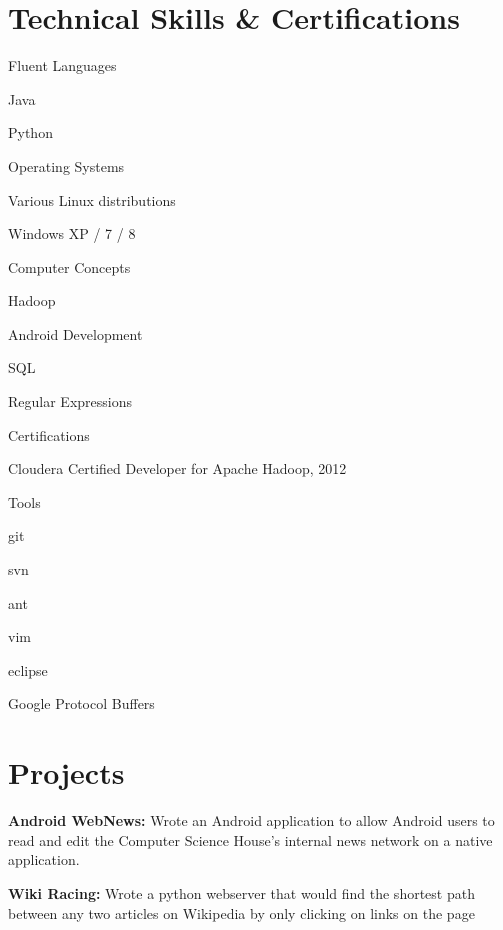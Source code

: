 \documentclass[a4paper,margin,line,11pt]{resume}
\begin{document}
\begin{resume}
\section{\mysidestyle Technical Skills \& Certifications}
	\begin{compactdesc}
		\item[Fluent Languages] \begin{inparaenum} { \small
			\item Java
			\item Python
		} \end{inparaenum}
		\item[Operating Systems] \begin{inparaenum} { \small
			\item Various Linux distributions
			\item Windows XP / 7 / 8
		} \end{inparaenum}
		\item[Computer Concepts] \begin{inparaenum} { \small
			\item Hadoop
			\item Android Development
			\item SQL
			\item Regular Expressions
		} \end{inparaenum}
		\item[Certifications] \begin{inparaenum} { \small
		    \item Cloudera Certified Developer for Apache Hadoop, 2012
		} \end{inparaenum}
        \item[Tools] \begin{inparaenum} { \small
            \item git
            \item svn
            \item ant
            \item vim
            \item eclipse
            \item Google Protocol Buffers
        } \end{inparaenum}
	\end{compactdesc}

\section{\mysidestyle Projects}
    \begin{asparablank}
        \item {\bf Android WebNews:} Wrote an Android application to allow Android users to read and edit the Computer Science House's internal news network on a native application.
        \normalsize
        \\
        \item {\bf Wiki Racing:} Wrote a python webserver that would find the shortest path between any two articles on Wikipedia by only clicking on links on the page
        \normalsize
    \end{asparablank}

\end{resume}
\end{document}
